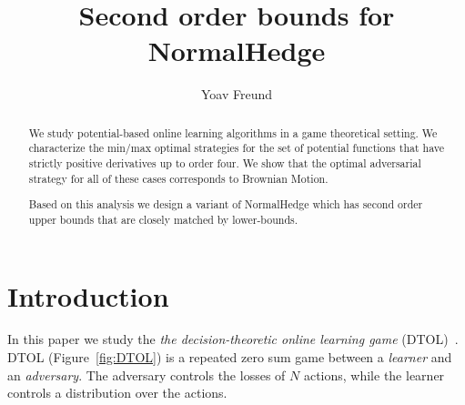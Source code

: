 \documentclass{article}[12pt]
\title{Second order bounds for NormalHedge}
\author{Yoav Freund}
\begin{document}
\maketitle
\begin{abstract}
  We study potential-based online learning algorithms in a game
  theoretical setting. We characterize the min/max optimal strategies
  for the set of potential functions that have strictly positive
  derivatives up to order four. We show that the optimal adversarial
  strategy for all of these cases corresponds to Brownian Motion.

  Based on this analysis we design a variant of NormalHedge which has
  second order upper bounds that are closely matched by lower-bounds.
\end{abstract}

\section{Introduction}
In this paper we study the {\em the decision-theoretic online learning game}
(DTOL)~\cite{freund1997decision}. DTOL (Figure~\ref{fig:DTOL}) is a
repeated zero sum game between a {\em learner} and an {\em
  adversary}. The adversary controls the losses of $N$ actions, while
the learner controls a distribution over the actions.
\newcommand{\Pvec}[1]{\vec{P}^{#1}}
\newcommand{\Lvec}[1]{\vec{L}^{#1}}
\newcommand{\Rdist}[1]{\bar{R}^{#1}}
\end{document}
